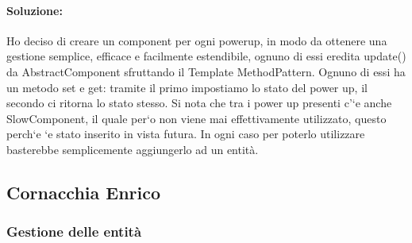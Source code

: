 \documentclass[a4paper,12pt]{report}
\begin{document}
\paragraph{Soluzione:}
Ho deciso di creare un component per ogni powerup, in modo da ottenere una gestione semplice, efficace e facilmente estendibile, ognuno di essi eredita update() da AbstractComponent sfruttando il Template MethodPattern. Ognuno di essi ha un metodo set e get: tramite il primo impostiamo lo stato del power up, il secondo ci ritorna lo stato stesso. Si nota che tra i power up presenti c’`e anche SlowComponent, il quale per`o non viene mai effettivamente utilizzato, questo perch`e `e stato inserito in vista futura. In ogni caso per poterlo utilizzare basterebbe semplicemente aggiungerlo ad un entità.


\subsection{Cornacchia Enrico}

\subsubsection{Gestione delle entità}
\end{document}
